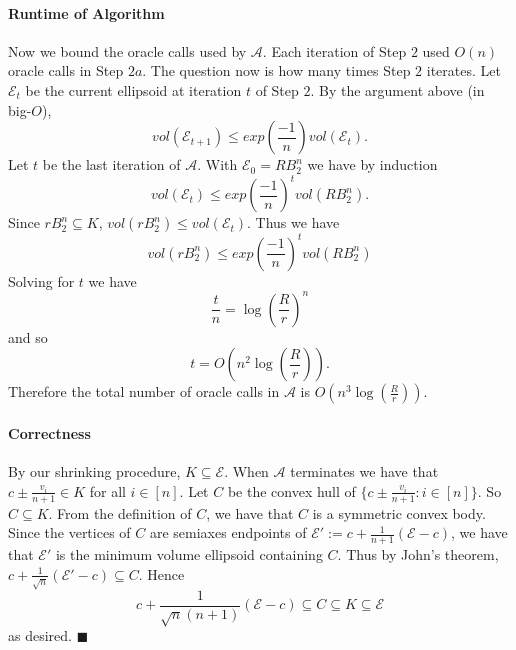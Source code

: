 \documentclass[letterpaper,12pt,oneside,onecolumn]{article}
\newcommand{\cA}{\mathcal{A}} \newcommand{\cB}{\mathcal{B}}
\newcommand{\cE}{\mathcal{E}} \newcommand{\cF}{\mathcal{F}}
\begin{document}
\paragraph{Runtime of Algorithm}
Now we bound the oracle calls used by $\cA$. Each iteration of Step $2$ used $O(n)$ oracle calls in Step $2a$. The question now is how many times Step $2$ iterates. Let $\cE_t$ be the current ellipsoid at iteration $t$ of Step $2$. By the argument above (in big-$O$),
$$vol(\cE_{t+1}) \leq exp(\frac{-1}{n}) vol(\cE_t).$$
Let $t$ be the last iteration of $\cA$. With $\cE_0 = RB^n_2$ we have by induction
$$vol(\cE_t) \leq exp(\frac{-1}{n})^t vol(RB^n_2).
$$Since $rB^n_2 \subseteq K$, $vol(rB^n_2) \leq vol(\cE_t)$. Thus we have
$$vol(rB^n_2) \leq exp(\frac{-1}{n})^t vol(RB^n_2)$$
Solving for $t$ we have
$$\frac{t}{n} = \log(\frac{R}{r})^n$$
and so 
$$t = O(n^2\log(\frac{R}{r})).$$
Therefore the total number of oracle calls in $\cA$ is $O(n^3\log(\frac{R}{r}))$.
\paragraph{Correctness}
By our shrinking procedure, $K \subseteq \cE$. When $\cA$ terminates we have that
$c\pm \frac{v_i}{n+1} \in K$ for all $i \in [n]$. Let $C$ be the convex hull of $\{c\pm \frac{v_i}{n+1} : i \in [n]\}$. So $C \subseteq K$. From the definition of $C$, we have that $C$ is a symmetric convex body. Since the vertices of $C$ are semiaxes endpoints of $\cE' := c + \frac{1}{n+1}(\cE - c)$, we have that $\cE'$ is the minimum volume ellipsoid containing $C$. Thus by John's theorem, $c + \frac{1}{\sqrt{n}}(\cE'-c) \subseteq C$. Hence 
$$c + \frac{1}{\sqrt{n}(n+1)}(\cE  - c) \subseteq C \subseteq K \subseteq \cE$$
as desired. $\blacksquare$
\section{}

\section{}
\end{document}
